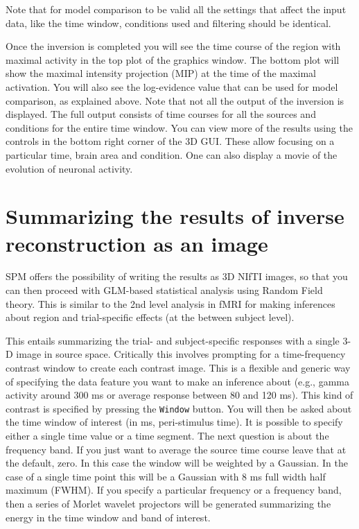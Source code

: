 Note that for model comparison to be valid all the settings that affect the input data, like the time window, conditions used and filtering should be identical.

Once the inversion is completed you will see the time course of the region with maximal activity in the top plot of the graphics window. The bottom plot will show the maximal intensity projection (MIP) at the time of the maximal activation. You will also see the log-evidence value that can be used for model comparison, as explained above. Note that not all the output of the inversion is displayed. The full output consists of time courses for all the sources and conditions for the entire time window. You can view more of the results using the controls in the bottom right corner of the 3D GUI. These allow focusing on a particular time, brain area and condition. One can also display a movie of the evolution of neuronal activity.

\section{Summarizing the results of inverse reconstruction as an image}
SPM offers the possibility of writing the results as 3D NIfTI images, so that you can then proceed with GLM-based statistical analysis using Random Field theory. This is similar to the 2nd level analysis in fMRI for making inferences about region and trial-specific effects (at the between subject level).

This entails summarizing the trial- and subject-specific responses with a single 3-D image in source space. Critically this involves prompting for a time-frequency contrast window to create each contrast image. This is a flexible and generic way of specifying the data feature you want to make an inference about (e.g., gamma activity around 300 ms or average response between 80 and 120 ms). This kind of contrast is specified by pressing the \texttt{Window} button. You will then be asked about the time window of interest (in ms, peri-stimulus time). It is possible to specify either a single time value or a time segment. The next question is about the frequency band. If you just want to average the source time course leave that at the default, zero. In this case the window will be weighted by a Gaussian. In the case of a single time point this will be a Gaussian with 8 ms full width half maximum (FWHM). If you specify a particular frequency or a frequency band, then a series of Morlet wavelet projectors will be generated summarizing the energy in the time window and band of interest.

